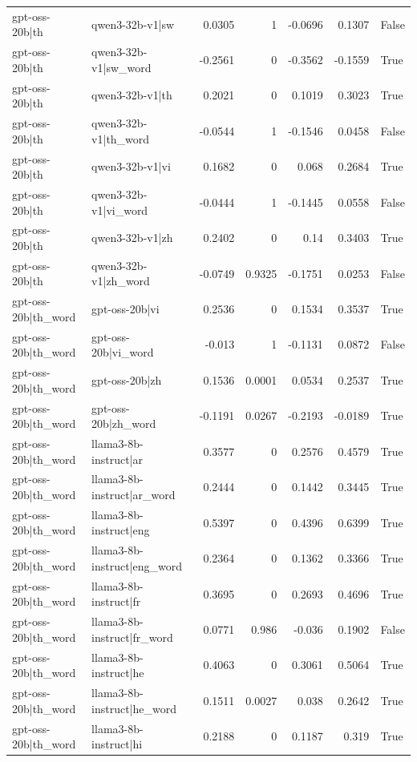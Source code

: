 \begin{table}
\begin{tabular}{l l r r r r l}
gpt-oss-20b|th & qwen3-32b-v1|sw & 0.0305 & 1 & -0.0696 & 0.1307 & False \\
gpt-oss-20b|th & qwen3-32b-v1|sw_word & -0.2561 & 0 & -0.3562 & -0.1559 & True \\
gpt-oss-20b|th & qwen3-32b-v1|th & 0.2021 & 0 & 0.1019 & 0.3023 & True \\
gpt-oss-20b|th & qwen3-32b-v1|th_word & -0.0544 & 1 & -0.1546 & 0.0458 & False \\
gpt-oss-20b|th & qwen3-32b-v1|vi & 0.1682 & 0 & 0.068 & 0.2684 & True \\
gpt-oss-20b|th & qwen3-32b-v1|vi_word & -0.0444 & 1 & -0.1445 & 0.0558 & False \\
gpt-oss-20b|th & qwen3-32b-v1|zh & 0.2402 & 0 & 0.14 & 0.3403 & True \\
gpt-oss-20b|th & qwen3-32b-v1|zh_word & -0.0749 & 0.9325 & -0.1751 & 0.0253 & False \\
gpt-oss-20b|th_word & gpt-oss-20b|vi & 0.2536 & 0 & 0.1534 & 0.3537 & True \\
gpt-oss-20b|th_word & gpt-oss-20b|vi_word & -0.013 & 1 & -0.1131 & 0.0872 & False \\
gpt-oss-20b|th_word & gpt-oss-20b|zh & 0.1536 & 0.0001 & 0.0534 & 0.2537 & True \\
gpt-oss-20b|th_word & gpt-oss-20b|zh_word & -0.1191 & 0.0267 & -0.2193 & -0.0189 & True \\
gpt-oss-20b|th_word & llama3-8b-instruct|ar & 0.3577 & 0 & 0.2576 & 0.4579 & True \\
gpt-oss-20b|th_word & llama3-8b-instruct|ar_word & 0.2444 & 0 & 0.1442 & 0.3445 & True \\
gpt-oss-20b|th_word & llama3-8b-instruct|eng & 0.5397 & 0 & 0.4396 & 0.6399 & True \\
gpt-oss-20b|th_word & llama3-8b-instruct|eng_word & 0.2364 & 0 & 0.1362 & 0.3366 & True \\
gpt-oss-20b|th_word & llama3-8b-instruct|fr & 0.3695 & 0 & 0.2693 & 0.4696 & True \\
gpt-oss-20b|th_word & llama3-8b-instruct|fr_word & 0.0771 & 0.986 & -0.036 & 0.1902 & False \\
gpt-oss-20b|th_word & llama3-8b-instruct|he & 0.4063 & 0 & 0.3061 & 0.5064 & True \\
gpt-oss-20b|th_word & llama3-8b-instruct|he_word & 0.1511 & 0.0027 & 0.038 & 0.2642 & True \\
gpt-oss-20b|th_word & llama3-8b-instruct|hi & 0.2188 & 0 & 0.1187 & 0.319 & True \\

\end{tabular}
\end{table}
